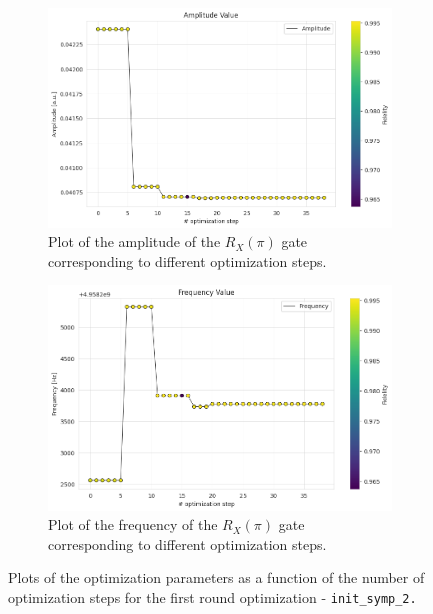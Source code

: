 \begin{figure}[h!]
    \centering
    \begin{subfigure}[t]{0.45\textwidth}
        \includegraphics[width=\textwidth]{figures/png/RB_optimization/NM/InitialSymplex/20241110_211211/amplitude.png}
        \caption{Plot of the amplitude of the $R_X(\pi)$ gate corresponding to different optimization steps.}
        \label{fig:20241110_211211:amplitude}
    \end{subfigure}
    \hfill
    \begin{subfigure}[t]{0.45\textwidth}
        \includegraphics[width=\textwidth]{figures/png/RB_optimization/NM/InitialSymplex/20241110_211211/frequency.png}
        \caption{Plot of the frequency of the $R_X(\pi)$ gate corresponding to different optimization steps.}
        \label{fig:20241110_211211:frequency}
    \end{subfigure}
    \caption{Plots of the optimization parameters as a function of the number of optimization steps for the first round optimization - \tt{init\_symp\_2}.}
    \label{fig:20241110_211211:parameters}
\end{figure}

